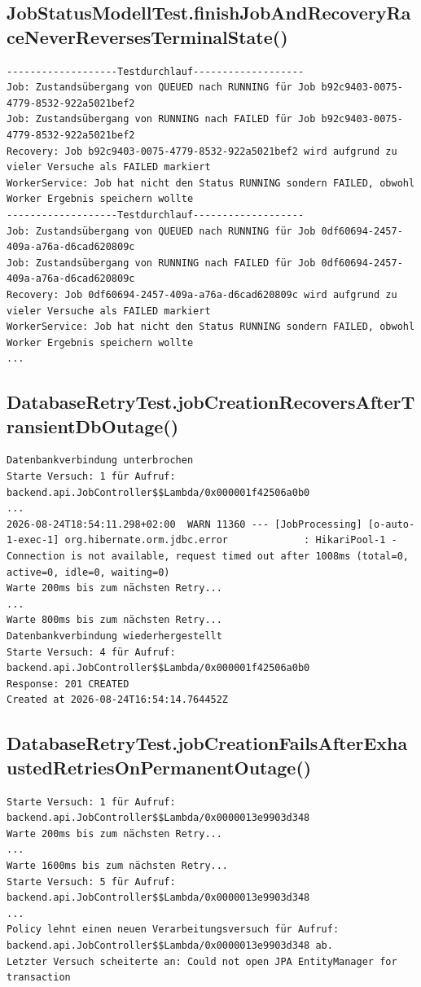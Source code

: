 \subsection*{JobStatusModellTest.finishJobAndRecoveryRaceNeverReversesTerminalState()}
\label{subsec:testlog_z5}
\begin{lstlisting}[language={}, style=logs, numbers=none]
    -------------------Testdurchlauf-------------------
Job: Zustandsübergang von QUEUED nach RUNNING für Job b92c9403-0075-4779-8532-922a5021bef2
Job: Zustandsübergang von RUNNING nach FAILED für Job b92c9403-0075-4779-8532-922a5021bef2
Recovery: Job b92c9403-0075-4779-8532-922a5021bef2 wird aufgrund zu vieler Versuche als FAILED markiert
WorkerService: Job hat nicht den Status RUNNING sondern FAILED, obwohl Worker Ergebnis speichern wollte
-------------------Testdurchlauf-------------------
Job: Zustandsübergang von QUEUED nach RUNNING für Job 0df60694-2457-409a-a76a-d6cad620809c
Job: Zustandsübergang von RUNNING nach FAILED für Job 0df60694-2457-409a-a76a-d6cad620809c
Recovery: Job 0df60694-2457-409a-a76a-d6cad620809c wird aufgrund zu vieler Versuche als FAILED markiert
WorkerService: Job hat nicht den Status RUNNING sondern FAILED, obwohl Worker Ergebnis speichern wollte
...
\end{lstlisting}

\subsection*{DatabaseRetryTest.jobCreationRecoversAfterTransientDbOutage()}
\label{subsec:testlog_z6_a}
\begin{lstlisting}[language={}, style=logs, numbers=none]
Datenbankverbindung unterbrochen
Starte Versuch: 1 für Aufruf: backend.api.JobController$$Lambda/0x000001f42506a0b0
...
2026-08-24T18:54:11.298+02:00  WARN 11360 --- [JobProcessing] [o-auto-1-exec-1] org.hibernate.orm.jdbc.error             : HikariPool-1 - Connection is not available, request timed out after 1008ms (total=0, active=0, idle=0, waiting=0)
Warte 200ms bis zum nächsten Retry...
...
Warte 800ms bis zum nächsten Retry...
Datenbankverbindung wiederhergestellt
Starte Versuch: 4 für Aufruf: backend.api.JobController$$Lambda/0x000001f42506a0b0
Response: 201 CREATED
Created at 2026-08-24T16:54:14.764452Z
\end{lstlisting}

\subsection*{DatabaseRetryTest.jobCreationFailsAfterExhaustedRetriesOnPermanentOutage()}
\label{subsec:testlog_z6_a_gegenprobe}
\begin{lstlisting}[language={}, style=logs, numbers=none]
Starte Versuch: 1 für Aufruf: backend.api.JobController$$Lambda/0x0000013e9903d348
Warte 200ms bis zum nächsten Retry...
...
Warte 1600ms bis zum nächsten Retry...
Starte Versuch: 5 für Aufruf: backend.api.JobController$$Lambda/0x0000013e9903d348
...
Policy lehnt einen neuen Verarbeitungsversuch für Aufruf: backend.api.JobController$$Lambda/0x0000013e9903d348 ab.
Letzter Versuch scheiterte an: Could not open JPA EntityManager for transaction
\end{lstlisting}

